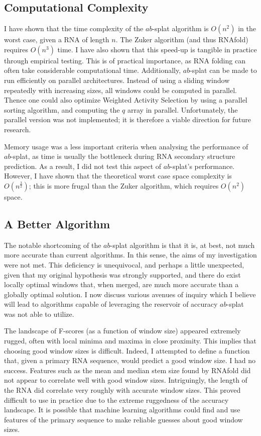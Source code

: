 \documentclass{cshonours}
\begin{document}
\subsection{Computational Complexity}

I have shown that the time complexity of the $ab$-splat algorithm is $O(n^2)$ in the worst case, given a RNA of length $n$. The Zuker algorithm (and thus RNAfold) requires $O(n^3)$ time. I have also shown that this speed-up is tangible in practice through empirical testing. This is of practical importance, as RNA folding can often take considerable computational time. Additionally, $ab$-splat can be made to run efficiently on parallel architectures. Instead of using a sliding window repeatedly with increasing sizes, all windows could be computed in parallel. Thence one could also optimize Weighted Activity Selection by using a parallel sorting algorithm, and computing the $q$ array in parallel. Unfortunately, the parallel version was not implemented; it is therefore a viable direction for future research.

Memory usage was a less important criteria when analysing the performance of $ab$-splat, as time is usually the bottleneck during RNA secondary structure prediction. As a result, I did not test this aspect of $ab$-splat's performance. However, I have shown that the theoretical worst case space complexity is $O(n^\frac{3}{2})$; this is more frugal than the Zuker algorithm, which requires $O(n^2)$ space.

\subsection{A Better Algorithm}

The notable shortcoming of the $ab$-splat algorithm is that it is, at best, not much more accurate than current algorithms. In this sense, the aims of my investigation were not met. This deficiency is unequivocal, and perhaps a little unexpected, given that my original hypothesis was strongly supported, and there do exist locally optimal windows that, when merged, are much more accurate than a globally optimal solution. I now discuss various avenues of inquiry which I believe will lead to algorithms capable of leveraging the reservoir of accuracy $ab$-splat was not able to utilize.

The landscape of F-scores (as a function of window size) appeared extremely rugged, often with local minima and maxima in close proximity. This implies that choosing good window sizes is difficult. Indeed, I attempted to define a function that, given a primary RNA sequence, would predict a good window size. I had no success. Features such as the mean and median stem size found by RNAfold did not appear to correlate well with good window sizes. Intriguingly, the length of the RNA did correlate very roughly with accurate window sizes. This proved difficult to use in practice due to the extreme ruggedness of the accuracy landscape. It is possible that machine learning algorithms could find and use features of the primary sequence to make reliable guesses about good window sizes. 
\end{document}
